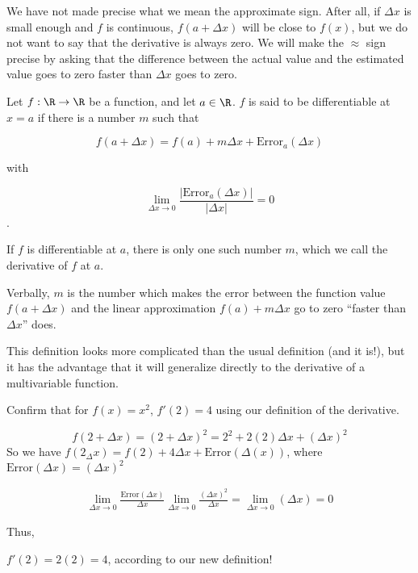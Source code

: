 \documentclass{ximera}
\begin{document}
We have not made precise what we mean the approximate sign.  After all, if $\Delta x$ is small enough and $f$ is continuous, 
$f(a+\Delta x)$ will be close to $f(x)$, but we do not want to say that the derivative is always zero.  We will make the  $\approx$ sign precise by asking that the difference 
between the actual value and the estimated value goes to zero faster than $\Delta x$ goes to zero.

\begin{definition}
  Let $f: \R \to \R$ be a function, and let $a \in \R$.  $f$ is said to be differentiable at $x=a$ if there is a number $m$ such that 
  
  \[ f(a+\Delta x) = f(a) + m\Delta x + \text{Error}_a(\Delta x)\]
  
  with
  
  \[ \lim_{\Delta x \to 0} \frac{\left|\text{Error}_a(\Delta x)\right|}{\left|\Delta x\right|} = 0 \].
  
  If $f$ is differentiable at $a$, there is only one such number $m$, which we call the derivative of $f$ at $a$.  
  
  Verbally,  $m$ is the number which makes the error between the function value $f(a+\Delta x)$ and the linear approximation $f(a)+m\Delta x$ go to zero 
  ``faster than $\Delta x$'' does.
\end{definition}

This definition looks more complicated than the usual definition (and it is!), but it has the advantage that it will 
generalize directly to the derivative of a multivariable function.
	

Confirm that for $f(x)=x^2$, $f'(2)=4$ using our definition of the derivative.
	
\begin{free-response}
  \[
  f(2+\Delta x) = (2+\Delta x)^2 = 2^2+2(2)\Delta x + (\Delta x)^2
  \]
  So we have $f(2_\Delta x) = f(2)+4\Delta x + \text{Error}(\Delta(x))$, where $\text{Error}(\Delta x) = (\Delta x)^2$
  
  \begin{align*}
    \lim_{\Delta x \to 0} \frac{\text{Error}(\Delta x)}{\Delta x}
    \lim_{\Delta x \to 0} \frac{(\Delta x)^2}{\Delta x} 
    = \lim_{\Delta x \to 0} \left(\Delta x  \right)
    = 0
  \end{align*}
  
  Thus, 
  
  $f'(2) = 2(2) =4$, according to our new definition!
\end{free-response}
\end{document}
